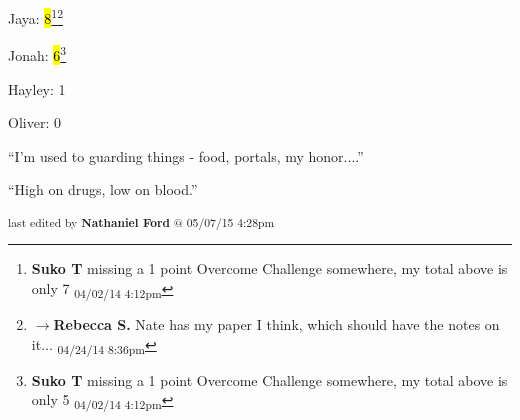 
Jaya: \hl{8}\footnote{\textbf{Suko T }missing a 1 point Overcome Challenge somewhere, my total above is only 7 \textsubscript{04/02/14 4:12pm}}\footnote{$\rightarrow$\textbf{Rebecca S. }Nate has my paper I think, which should have the notes on it... \textsubscript{04/24/14 8:36pm}}

Jonah: \hl{6}\footnote{\textbf{Suko T }missing a 1 point Overcome Challenge somewhere, my total above is only 5 \textsubscript{04/02/14 4:12pm}}

Hayley: 1

Oliver: 0





``I'm used to guarding things -  food, portals, my honor....''




``High on drugs, low on blood.''




\vspace{\fill}

\begin{flushright}
\textsubscript{last edited by \textbf{Nathaniel Ford} @ 05/07/15 4:28pm}
\end{flushright}

